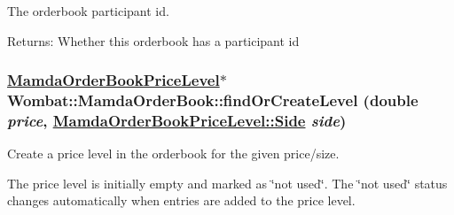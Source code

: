 The orderbook participant id. 

\begin{Desc}
\item[Returns:]Whether this orderbook has a participant id \end{Desc}
\hypertarget{classWombat_1_1MamdaOrderBook_b181704a75f03505d23da96a8b18ec88}{
\subsubsection[findOrCreateLevel]{\setlength{\rightskip}{0pt plus 5cm}\hyperlink{classWombat_1_1MamdaOrderBookPriceLevel}{Mamda\-Order\-Book\-Price\-Level}$\ast$ Wombat::Mamda\-Order\-Book::find\-Or\-Create\-Level (double {\em price}, \hyperlink{classWombat_1_1MamdaOrderBookPriceLevel_384c34b0a74d874b8969dee9b0d3718d}{Mamda\-Order\-Book\-Price\-Level::Side} {\em side})}}
\label{classWombat_1_1MamdaOrderBook_b181704a75f03505d23da96a8b18ec88}


Create a price level in the orderbook for the given price/size. 

The price level is initially empty and marked as \char`\"{}not used\char`\"{}. The \char`\"{}not used\char`\"{} status changes automatically when entries are added to the price level.

